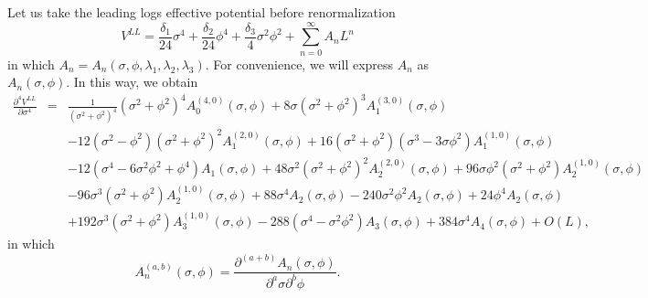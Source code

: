 \documentclass[11pt,a4paper,english,superscriptaddress,preprint,aps,prd]{revtex4}
\begin{document}
Let us take the leading logs effective potential before renormalization
\begin{equation}\label{effPot}
 V^{LL} = \frac{\delta_1}{24}\sigma^4 + \frac{\delta_2}{24}\phi^4 + \frac{\delta_3}{4}\sigma^2\phi^2 + \sum_{n=0}^\infty A_nL^n
\end{equation}
in which $A_n = A_n(\sigma,\phi,\lambda_1,\lambda_2,\lambda_3)$. For convenience, we will express $A_n$ as $A_n(\sigma,\phi)$. In this way, we obtain
\begin{eqnarray}\label{D4sigma}
 \frac{\partial^4V^{LL}}{\partial\sigma^4} &=& \frac{1}{\left(\sigma ^2+\phi ^2\right)^4}\left(\sigma ^2+\phi ^2\right)^4 A_0^{(4,0)}(\sigma ,\phi )+8 \sigma  \left(\sigma ^2+\phi ^2\right)^3 A_1^{(3,0)}(\sigma ,\phi )\nonumber\\
 &&-12 \left(\sigma ^2-\phi ^2\right) \left(\sigma ^2+\phi ^2\right)^2 A_1^{(2,0)}(\sigma ,\phi )+16 \left(\sigma ^2+\phi ^2\right) \left(\sigma ^3-3 \sigma  \phi ^2\right) A_1^{(1,0)}(\sigma ,\phi )\nonumber\\
 &&-12 \left(\sigma ^4-6 \sigma ^2 \phi ^2+\phi ^4\right) A_1(\sigma ,\phi )+48 \sigma ^2 \left(\sigma ^2+\phi ^2\right)^2 A_2^{(2,0)}(\sigma ,\phi )+96 \sigma  \phi ^2 \left(\sigma ^2+\phi ^2\right) A_2^{(1,0)}(\sigma ,\phi )\nonumber\\
 &&-96 \sigma ^3 \left(\sigma ^2+\phi ^2\right) A_2^{(1,0)}(\sigma ,\phi )+88 \sigma ^4 A_2(\sigma ,\phi )-240 \sigma ^2 \phi ^2 A_2(\sigma ,\phi )+24 \phi ^4 A_2(\sigma ,\phi )\nonumber\\
 &&+192 \sigma ^3 \left(\sigma ^2+\phi ^2\right) A_3^{(1,0)}(\sigma ,\phi )-288 \left(\sigma ^4-\sigma ^2 \phi ^2\right) A_3(\sigma ,\phi )+384 \sigma ^4 A_4(\sigma ,\phi ) + O(L),
\end{eqnarray}
in which
\begin{equation}
 A_n^{(a,b)}(\sigma,\phi)=\frac{\partial^{(a+b)}A_n(\sigma,\phi)}{\partial^a\sigma\partial^b\phi}.
\end{equation}
\end{document}
